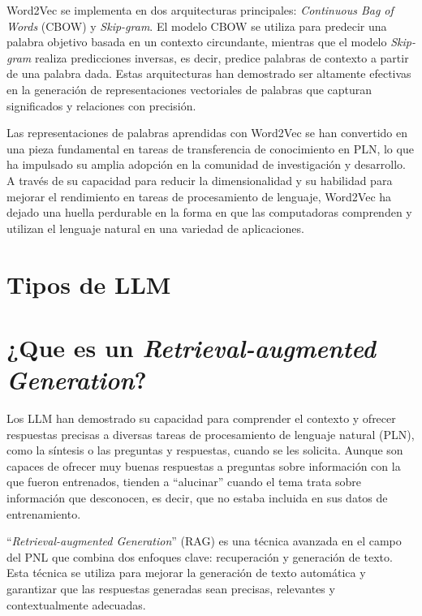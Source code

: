 Word2Vec se implementa en dos arquitecturas principales: \textit{Continuous Bag of Words} (CBOW) y \textit{Skip-gram}. El modelo CBOW se utiliza para predecir una palabra objetivo basada en un contexto circundante, mientras que el modelo \textit{Skip-gram} realiza predicciones inversas, es decir, predice palabras de contexto a partir de una palabra dada. Estas arquitecturas han demostrado ser altamente efectivas en la generación de representaciones vectoriales de palabras que capturan significados y relaciones con precisión.

Las representaciones de palabras aprendidas con Word2Vec se han convertido en una pieza fundamental en tareas de transferencia de conocimiento en PLN, lo que ha impulsado su amplia adopción en la comunidad de investigación y desarrollo. A través de su capacidad para reducir la dimensionalidad y su habilidad para mejorar el rendimiento en tareas de procesamiento de lenguaje, Word2Vec ha dejado una huella perdurable en la forma en que las computadoras comprenden y utilizan el lenguaje natural en una variedad de aplicaciones.

\section{Tipos de LLM}


\section{¿Que es un \textit{Retrieval-augmented Generation}?}

Los LLM han demostrado su capacidad para comprender el contexto y ofrecer respuestas precisas a diversas tareas de procesamiento de lenguaje natural (PLN), como la síntesis o las preguntas y respuestas, cuando se les solicita. Aunque son capaces de ofrecer muy buenas respuestas a preguntas sobre información con la que fueron entrenados, tienden a ``alucinar'' cuando el tema trata sobre información que desconocen, es decir, que no estaba incluida en sus datos de entrenamiento.

``\textit{Retrieval-augmented Generation}'' (RAG) es una técnica avanzada en el campo del PNL que combina dos enfoques clave: recuperación y generación de texto. Esta técnica se utiliza para mejorar la generación de texto automática y garantizar que las respuestas generadas sean precisas, relevantes y contextualmente adecuadas\cite{Lewis2020}.

